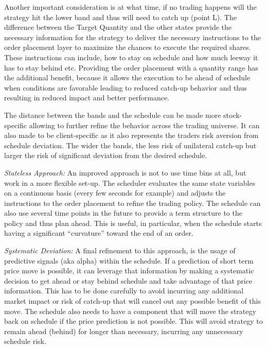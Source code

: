 Another important consideration is at what time, if no trading happens will the strategy hit the lower band and thus will need to catch up (point L). The difference between the Target Quantity and the other states provide the necessary  information for the strategy to deliver the necessary instructions to the order placement layer to maximize the chances to execute the required shares. These instructions can include, how to stay on schedule and how much leeway it has to stay behind etc. Providing the order placement with a quantity range has the additional benefit, because it allows the execution to be ahead of schedule when conditions are favorable leading to reduced catch-up behavior and thus resulting in reduced impact and better performance.


The distance between the bands and the schedule can be made more stock-specific allowing to further refine the behavior across the trading universe. It can also made to be client-specific as it also represents the traders risk aversion from schedule deviation. The wider the bands, the less risk of unilateral catch-up but larger the risk of significant deviation from the desired schedule. \twomedskip


\noindent\emph{Stateless Approach:} An improved approach is not to use time bins at all, but work in a more flexible set-up. The scheduler evaluates the same state variables on a continuous basis (every few seconds for example) and adjusts the instructions to the order placement to refine the trading policy. The schedule can also use several time points in the future to provide a term structure to the policy and thus plan ahead. This is useful, in particular, when the schedule starts having a significant ``curvature'' toward the end of an order. \twomedskip


\noindent\emph{Systematic Deviation:} A final refinement to this approach, is the usage of predictive signals (aka alpha) within the schedule. If a prediction of short term price move is possible, it can leverage that information by making a systematic decision to get ahead or stay behind schedule and take advantage of that price information. This has to be done carefully to avoid incurring any additional market impact or risk of catch-up that will cancel out any possible benefit of this move. The schedule also needs to have a component that will move the strategy back on schedule if the price prediction is not possible. This will avoid strategy to remain ahead (behind) for longer than necessary, incurring any unnecessary schedule risk.



